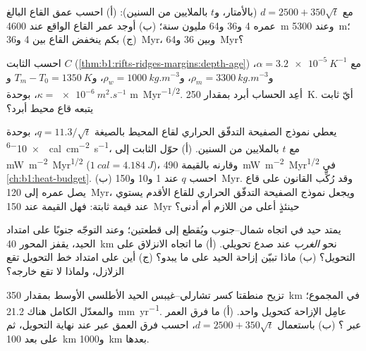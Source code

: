 \begin{exercise}[$\star\star$]\label{exo:b1:rifts-ridges-margins:5}
مع $d = 2500 + 350\sqrt t$ (بالأمتار، و$t$ بالملايين من السنين): (أ) احسب عمق القاع البالغ عمره 4 و\num{36} و\num{64} مليون سنة؛ (ب) أوجد عمر القاع الواقع عند \qty{4600}{m} وعند \qty{5300}{m}؛ (ج) بكم ينخفض القاع بين 4 و\qty{36}{Myr}، وبين 36 و\qty{64}{Myr}؟
\end{exercise}

\begin{exercise}[$\star\star$]\label{exo:b1:rifts-ridges-margins:6}
احسب الثابت $C$  (\cref{thm:b1:rifts-ridges-margins:depth-age}) مع $\alpha =
\qty{3.2e-5}{K^{-1}}$، و$\rho_m = \qty{3300}{kg.m^{-3}}$، و$\rho_w =
\qty{1000}{kg.m^{-3}}$، و$T_m - T_0 = \qty{1350}{K}$ و$\kappa =
\qty{e-6}{m^2.s^{-1}}$، بوحدة \unit{m.Myr^{-1/2}}. أعِد الحساب  أبرد بمقدار \qty{250}{K}. أيّ ثابت يتبعه قاع محيط أبرد؟
\end{exercise}

\begin{exercise}[$\star\star$]\label{exo:b1:rifts-ridges-margins:7}
يعطي نموذج الصفيحة التدفّق الحراري لقاع المحيط بالصيغة $q = 11.3/\sqrt t$، بوحدة \qty{e-6}{cal.cm^{-2}.s^{-1}}، مع $t$ بالملايين من السنين. (أ) حوّل الثابت إلى \unit{mW.m^{-2}.Myr^{1/2}} ($\qty{1}{cal} =
\qty{4.184}{J}$)، وقارنه بالقيمة \qty{490}{mW.m^{-2}.Myr^{1/2}} في \cref{ch:b1:heat-budget}. (ب) احسب $q$ عند 1 و\num{10} و\qty{150}{Myr}. وقد رُكِّب القانون على قاع يصل عمره إلى \qty{120}{Myr}، ويجعل نموذج الصفيحة التدفّق الحراري للقاع الأقدم يستوي عند قيمة ثابتة: فهل القيمة عند \qty{150}{Myr} حينئذٍ أعلى من اللازم أم أدنى؟
\end{exercise}

\begin{exercise}[$\star\star$]\label{exo:b1:rifts-ridges-margins:8}
يمتد حيد في اتجاه شمال–جنوب ويُقطع إلى قطعتين؛ وعند التوجّه جنوبًا على امتداد الحيد، يقفز المحور \qty{40}{km} نحو \emph{الغرب} عند صدع تحويلي. (أ) ما اتجاه الانزلاق على التحويل؟ (ب) ماذا تبيّن إزاحة الحيد على ما يبدو؟ (ج) أين على امتداد خط التحويل تقع الزلازل، ولماذا لا تقع خارجه؟
\end{exercise}

\begin{exercise}[$\star\star$]\label{exo:b1:rifts-ridges-margins:9}
تزيح منطقتا كسر تشارلي–غيبس الحيد الأطلسي الأوسط بمقدار \qty{350}{km} في المجموع؛ والمعدّل الكامل هناك \qty{21.2}{mm.yr^{-1}}. عامِل الإزاحة كتحويل واحد. (أ) ما فرق العمر عبر ؟ (ب) باستعمال $d = 2500 + 350\sqrt t$، احسب فرق العمق عبر  عند نهاية التحويل، ثم على بعد \qty{100}{km} و\qty{1000}{km} بعدها.
\end{exercise}

